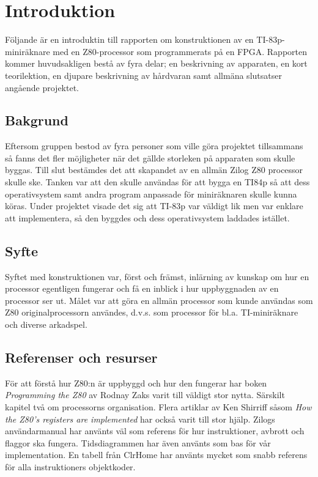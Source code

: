 \documentclass[main.tex]{subfiles}
\begin{document}
\section{Introduktion}
Följande är en introduktin till rapporten om konstruktionen av en
TI-83p-miniräknare med en Z80-processor som programmerats på en FPGA.
Rapporten kommer huvudsakligen bestå av fyra delar; en beskrivning av
apparaten, en kort teorilektion, en djupare beskrivning av hårdvaran samt
allmäna slutsatser angående projektet.

\subsection{Bakgrund}
Eftersom gruppen bestod av fyra personer som ville göra projektet tillsammans
så fanns det fler möjligheter när det gällde storleken på apparaten som skulle
byggas. Till slut bestämdes det att skapandet av en allmän Zilog Z80 processor
skulle ske. Tanken var att den skulle användas för att bygga en TI84p så att
dess operativsystem samt andra program anpassade för miniräknaren skulle kunna
köras. Under projektet visade det sig att TI-83p var väldigt lik men var
enklare att implementera, så den byggdes och dess operativsystem laddades
istället.

\subsection{Syfte}
Syftet med konstruktionen var, först och främst, inlärning av kunskap om hur en
processor egentligen fungerar och få en inblick i hur uppbyggnaden av en
processor ser ut. Målet var att göra en allmän processor som kunde användas som
Z80 originalprocessorn användes, d.v.s. som processor för bl.a. TI-miniräknare
och diverse arkadspel.

\subsection{Referenser och resurser} För att förstå hur Z80:n är uppbyggd och
hur den fungerar har boken {\it Programming the Z80}\cite{zaks-z80prog} av
Rodnay Zaks varit till väldigt stor nytta. Särskilt kapitel två om processorns
organisation. Flera artiklar av Ken Shirriff såsom {\it How the Z80's registers
are implemented}\cite{shirriff-reg} har också varit till stor hjälp. Zilogs
användarmanual\cite{z80um} har använts väl som referens för hur instruktioner,
avbrott och flaggor ska fungera.  Tidsdiagrammen har även använts som bas för
vår implementation. En tabell från ClrHome\cite{clrhome} har använts mycket som
snabb referens för alla instruktioners objektkoder.
\end{document}
